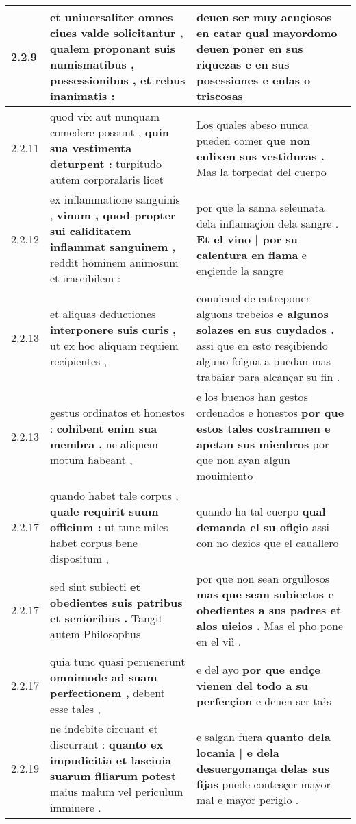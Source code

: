 \begin{tabular}{|p{1cm}|p{6.5cm}|p{6.5cm}|}
2.2.9 & et uniuersaliter omnes ciues valde solicitantur , \textbf{ qualem proponant suis numismatibus , } possessionibus , et rebus inanimatis : & deuen ser muy acuçiosos \textbf{ en catar qual mayordomo deuen poner en sus riquezas } e en sus posessiones e enlas o triscosas \\\hline
2.2.11 & quod vix aut nunquam comedere possunt , \textbf{ quin sua vestimenta deturpent : } turpitudo autem corporalaris licet & Los quales abeso nunca pueden comer \textbf{ que non enlixen sus vestiduras . } Mas la torpedat del cuerpo \\\hline
2.2.12 & ex inflammatione sanguinis , \textbf{ vinum , quod propter sui caliditatem inflammat sanguinem , } reddit hominem animosum et irascibilem : & por que la sanna seleunata dela inflamaçion dela sangre . \textbf{ Et el vino | por su calentura en flama } e ençiende la sangre \\\hline
2.2.13 & et aliquas deductiones \textbf{ interponere suis curis , } ut ex hoc aliquam requiem recipientes , & conuienel de entreponer alguons trebeios \textbf{ e algunos solazes en sus cuydados . } assi que en esto resçibiendo alguno folgua a puedan mas trabaiar para alcançar su fin . \\\hline
2.2.13 & gestus ordinatos et honestos : \textbf{ cohibent enim sua membra , } ne aliquem motum habeant , & e los buenos han gestos ordenados e honestos \textbf{ por que estos tales costramnen e apetan sus mienbros } por que non ayan algun mouimiento \\\hline
2.2.17 & quando habet tale corpus , \textbf{ quale requirit suum officium : } ut tunc miles habet corpus bene dispositum , & quando ha tal cuerpo \textbf{ qual demanda el su ofiçio } assi con no dezios que el cauallero \\\hline
2.2.17 & sed sint subiecti \textbf{ et obedientes suis patribus et senioribus . } Tangit autem Philosophus & por que non sean orgullosos \textbf{ mas que sean subiectos e obedientes a sus padres et alos uieios . } Mas el pho pone en el vii̊ . \\\hline
2.2.17 & quia tunc quasi peruenerunt \textbf{ omnimode ad suam perfectionem , } debent esse tales , & e del ayo \textbf{ por que endçe vienen del todo a su perfecçion } e deuen ser tałs \\\hline
2.2.19 & ne indebite circuant et discurrant : \textbf{ quanto ex impudicitia et lasciuia suarum filiarum potest } maius malum vel periculum imminere . & e salgan fuera \textbf{ quanto dela locania | e dela desuergonança delas sus fijas } puede contesçer mayor mal e mayor periglo . \\\hline

\end{tabular}
